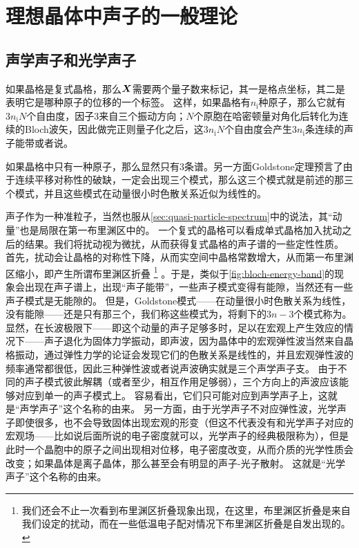 \section{理想晶体中声子的一般理论}

\subsection{声学声子和光学声子}

如果晶格是复式晶格，那么$\vb*{X}$需要两个量子数来标记，其一是格点坐标，其二是表明它是哪种原子的位移的一个标签。
这样，如果晶格有$n_\text{i}$种原子，那么它就有$3n_\text{i} N$个自由度，因子$3$来自三个振动方向；$N$个原胞在哈密顿量对角化后转化为连续的Bloch波矢，因此做完正则量子化之后，这$3n_\text{i} N$个自由度会产生$3n_\text{i}$条连续的声子能带或者说。

如果晶格中只有一种原子，那么显然只有$3$条谱。另一方面Goldstone定理预言了由于连续平移对称性的破缺，一定会出现三个模式，那么这三个模式就是前述的那三个模式，并且这些模式在动量很小时色散关系近似为线性的。

声子作为一种准粒子，当然也服从\autoref{sec:quasi-particle-spectrum}中的说法，其“动量”也是局限在第一布里渊区中的。
一个复式的晶格可以看成单式晶格加入扰动之后的结果。我们将扰动视为微扰，从而获得复式晶格的声子谱的一些定性性质。
首先，扰动会让晶格的对称性下降，从而实空间中晶格常数增大，从而第一布里渊区缩小，即产生所谓布里渊区折叠%
\footnote{
    我们还会不止一次看到布里渊区折叠现象出现，在这里，布里渊区折叠是来自我们设定的扰动，而在一些低温电子配对情况下布里渊区折叠是自发出现的。
}%
。于是，类似于\autoref{fig:bloch-energy-band}的现象会出现在声子谱上，出现“声子能带”，一些声子模式变得有能隙，当然还有一些声子模式是无能隙的。
但是，Goldstone模式——在动量很小时色散关系为线性，没有能隙——还是只有那三个，我们称这些模式为，将剩下的$3n-3$个模式称为。
显然，在长波极限下——即这个动量的声子足够多时，足以在宏观上产生效应的情况下——声子退化为固体力学振动，即声波，因为晶体中的宏观弹性波当然来自晶格振动，通过弹性力学的论证会发现它们的色散关系是线性的，并且宏观弹性波的频率通常都很低，因此三种弹性波或者说声波确实就是三个声学声子支。
由于不同的声子模式彼此解耦（或者至少，相互作用足够弱），三个方向上的声波应该能够对应到单一的声子模式上。
容易看出，它们只可能对应到声学声子上，这就是“声学声子”这个名称的由来。
另一方面，由于光学声子不对应弹性波，光学声子即使很多，也不会导致固体出现宏观的形变（但这不代表没有和光学声子对应的宏观场——比如说后面所说的电子密度就可以，光学声子的经典极限称为），但是此时一个晶胞中的原子之间出现相对位移，电子密度改变，从而介质的光学性质会改变；如果晶体是离子晶体，那么甚至会有明显的声子-光子散射。
这就是“光学声子”这个名称的由来。

